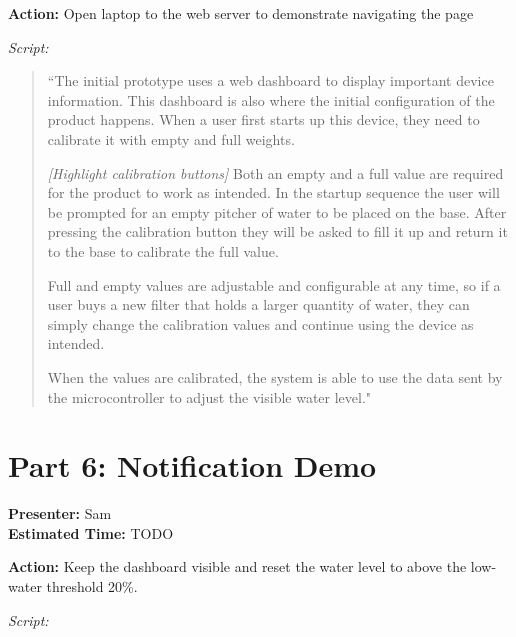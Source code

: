 \documentclass[12pt]{article}
\begin{document}
\noindent\textbf{Action:} Open laptop to the web server to demonstrate navigating the page

\bigskip
\noindent\textit{Script:}

\begin{quote}
``The initial prototype uses a web dashboard to display important device information. This dashboard is also where the initial configuration of the product happens. When a user first starts up this device, they need to calibrate it with empty and full weights. 

\textit{[Highlight calibration buttons]} Both an empty and a full value are required for the product to work as intended. In the startup sequence the user will be prompted for an empty pitcher of water to be placed on the base. After pressing the calibration button they will be asked to fill it up and return it to the base to calibrate the full value. 

Full and empty values are adjustable and configurable at any time, so if a user buys a new filter that holds a larger quantity of water, they can simply change the calibration values and continue using the device as intended. 

When the values are calibrated, the system is able to use the data sent by the microcontroller to adjust the visible water level."
\end{quote}

\section*{Part 6: Notification Demo}
\noindent\textbf{Presenter:} Sam\\  
\noindent\textbf{Estimated Time:} TODO

\noindent\textbf{Action:} Keep the dashboard visible and reset the water level to above the low-water threshold 20\%.

\bigskip
\noindent\textit{Script:}
\end{document}
